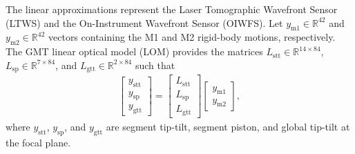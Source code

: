 \documentclass{gmto}
\begin{document}
The linear approximations represent the Laser Tomographic Wavefront Sensor (LTWS)  and the On-Instrument Wavefront Sensor (OIWFS). Let $y_\text{m1} \in \mathbb{R}^{42}$ and $y_\text{m2} \in \mathbb{R}^{42}$ vectors containing the M1 and M2 rigid-body motions, respectively. %
The GMT linear optical model (LOM) provides the matrices $L_\text{stt} \in \mathbb{R}^{14 \times 84}$, $L_\text{sp} \in \mathbb{R}^{7 \times 84}$, and $L_\text{gtt} \in \mathbb{R}^{2 \times 84}$ such that
\begin{align}
    \begin{bmatrix}
        y_\text{stt} \\ y_\text{sp} \\ y_\text{gtt}
    \end{bmatrix} =
    \begin{bmatrix} 
    L_\text{stt} \\ L_\text{sp} \\ L_\text{gtt}
\end{bmatrix}
    \begin{bmatrix}
    y_\text{m1} \\ y_\text{m2}
    \end{bmatrix}, \label{eq:lom}
\end{align}
where $y_\text{stt}$, $y_\text{sp}$, and $y_\text{gtt}$ are segment tip-tilt, segment piston, and global tip-tilt at the focal plane.
\end{document}
